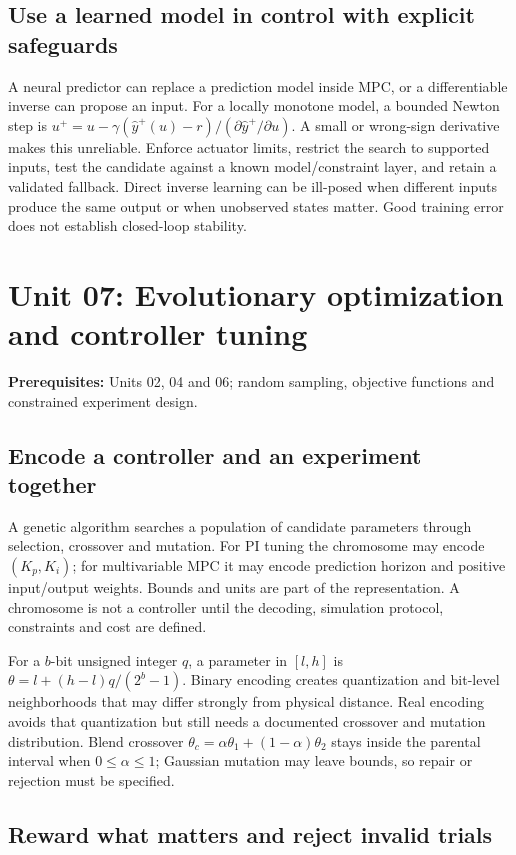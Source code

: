 \documentclass[11pt,a4paper]{article}
\begin{document}
\subsection{Use a learned model in control with explicit safeguards}

A neural predictor can replace a prediction model inside MPC, or a differentiable inverse can propose an input. For a locally monotone model, a bounded Newton step is $u^+=u-\gamma(\hat y^+(u)-r)/(\partial\hat y^+/\partial u)$. A small or wrong-sign derivative makes this unreliable. Enforce actuator limits, restrict the search to supported inputs, test the candidate against a known model/constraint layer, and retain a validated fallback. Direct inverse learning can be ill-posed when different inputs produce the same output or when unobserved states matter. Good training error does not establish closed-loop stability.

\clearpage\section{Unit 07: Evolutionary optimization and controller tuning}
\textbf{Prerequisites:} Units 02, 04 and 06; random sampling, objective functions and constrained experiment design.

\subsection{Encode a controller and an experiment together}

A genetic algorithm searches a population of candidate parameters through selection, crossover and mutation. For PI tuning the chromosome may encode $(K_p,K_i)$; for multivariable MPC it may encode prediction horizon and positive input/output weights. Bounds and units are part of the representation. A chromosome is not a controller until the decoding, simulation protocol, constraints and cost are defined.


For a $b$-bit unsigned integer $q$, a parameter in $[l,h]$ is $\theta=l+(h-l)q/(2^b-1)$. Binary encoding creates quantization and bit-level neighborhoods that may differ strongly from physical distance. Real encoding avoids that quantization but still needs a documented crossover and mutation distribution. Blend crossover $\theta_c=\alpha\theta_1+(1-\alpha)\theta_2$ stays inside the parental interval when $0\leq\alpha\leq1$; Gaussian mutation may leave bounds, so repair or rejection must be specified.


\subsection{Reward what matters and reject invalid trials}
\end{document}
